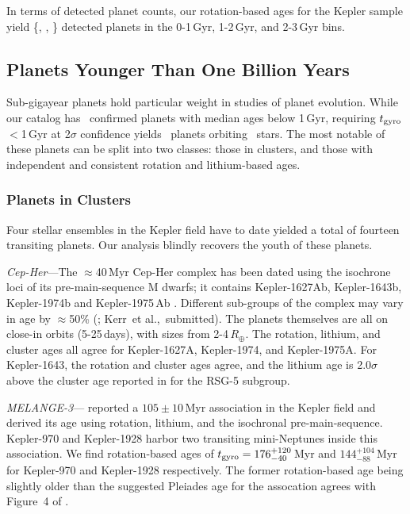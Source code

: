 \documentclass[11pt,twocolumn,tighten]{aastex63}
\begin{document}
In terms of detected planet counts, our rotation-based ages for the
Kepler sample yield \{\nplyounggyro, \nplmidgyro, \nploldgyro\}
detected planets in the 0-1\,Gyr, 1-2\,Gyr, and 2-3\,Gyr bins.  


\subsection{Planets Younger Than One Billion Years}

Sub-gigayear planets hold particular weight in studies of planet
evolution.
While our catalog has \nplyounggyro\ confirmed planets
with median ages below 1\,Gyr, requiring $t_{\rm gyro}$$<$1\,Gyr at
2$\sigma$ confidence yields \nplyounggyrotwosigma\ planets orbiting
\nplhostsyounggyrotwosigma\ stars.  
The most notable of these planets can be split into two classes: those
in clusters, and those with independent and consistent rotation and
lithium-based ages.

\subsubsection{Planets in Clusters}
\label{subsec:clusterplanets}

Four stellar ensembles in the Kepler field have to date yielded a
total of fourteen transiting planets.  Our analysis blindly recovers
the youth of these planets.

{\it Cep-Her}---The $\approx$40\,Myr Cep-Her complex has been
dated using the isochrone loci of its
pre-main-sequence M dwarfs; it contains Kepler-1627Ab, Kepler-1643b,
Kepler-1974b and Kepler-1975\,Ab \citep{Bouma_2022b,Bouma_2022a}.
Different sub-groups of the complex may vary in age by $\approx$50\%
(\citealt{Bouma_2022b}; Kerr~et al.,~submitted).  The planets
themselves are all on close-in orbits (5-25\,days), with sizes from
2-4\,$R_\oplus$.  The rotation, lithium, and cluster ages all agree
for Kepler-1627A, Kepler-1974, and Kepler-1975A.  For Kepler-1643, the
rotation and cluster ages agree, and the lithium age is 2.0$\sigma$
above the cluster age reported in \citet{Bouma_2022b} for the RSG-5
subgroup.

{\it MELANGE-3}---\citet{Barber_2022} reported a
$105\pm10$\,Myr association in the Kepler field and derived its age
using rotation, lithium, and the isochronal pre-main-sequence.
Kepler-970 and Kepler-1928 harbor two transiting mini-Neptunes inside
this association.  We find rotation-based ages
of $t_{\rm
gyro}=176_{-40}^{+120}$\,Myr and $144_{-88}^{+104}$\,Myr for
Kepler-970 and Kepler-1928 respectively.  The former rotation-based
age being slightly older than the suggested Pleiades age for the
assocation agrees with Figure~4 of \citet{Barber_2022}.
\end{document}
